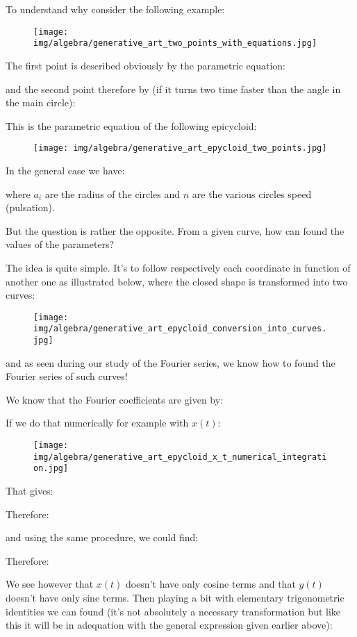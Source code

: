 	To understand why consider the following example:
	\begin{figure}[H]
		\centering
		\texttt{[image: img/algebra/generative\_art\_two\_points\_with\_equations.jpg]}
	\end{figure} 
	The first point is described  obviously by the parametric equation:
	
	and the second point therefore by (if it turns two time faster than the angle in the main circle):
	
	This is the parametric equation of the following epicycloid:
	\begin{figure}[H]
		\centering
		\texttt{[image: img/algebra/generative\_art\_epycloid\_two\_points.jpg]}
	\end{figure} 
	In the general case we have:
	
	where $a_i$ are the radius of the circles and $n$ are the various circles speed (pulsation).
	
	But the question is rather the opposite. From a given curve, how can found the values of the parameters?
	
	The idea is quite simple. It's to follow respectively each coordinate in function of another one as illustrated below, where the closed shape is transformed into two curves:
	\begin{figure}[H]
		\centering
		\texttt{[image: img/algebra/generative\_art\_epycloid\_conversion\_into\_curves.jpg]}
	\end{figure} 
	and as seen during our study of the Fourier series, we know how to found the Fourier series of such curves!
	
	We know that the Fourier coefficients are given by:
	
	If we do that numerically for example with $x(t)$:
	\begin{figure}[H]
		\centering
		\texttt{[image: img/algebra/generative\_art\_epycloid\_x\_t\_numerical\_integration.jpg]}
	\end{figure} 
	That gives:
	
	Therefore:
	
	and using the same procedure, we could find:
	
	Therefore:
	
	We see however that $x(t)$ doesn't have only cosine terms and that $y(t)$ doesn't have only  sine terms. Then playing a bit with elementary trigonometric identities we can found (it's not absolutely a necessary transformation but like this it will be in adequation with the general expression given earlier above):
	
